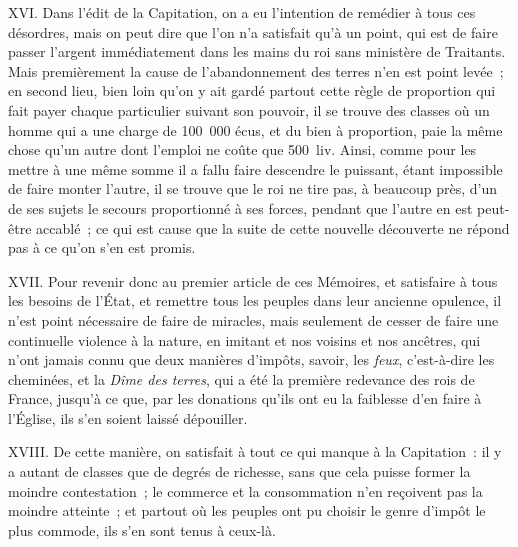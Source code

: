 \documentclass[french,twoside]{book} %
\begin{document}
XVI. Dans l’édit de la Capitation, on a eu l’intention de remédier à tous ces désordres, mais on peut dire que l’on n’a satisfait qu’à un point, qui est de faire passer l’argent immédiatement dans les mains du roi sans ministère de Traitants. Mais premièrement la cause de l’abandonnement des terres n’en est point levée ; en second lieu, bien loin qu’on y ait gardé partout cette règle de proportion qui fait payer chaque particulier suivant son pouvoir, il se trouve des classes où un homme qui a une charge de 100 000 écus, et du bien à proportion, paie la même chose qu’un autre dont l’emploi ne coûte que 500 liv. Ainsi, comme pour les mettre à une même somme il a fallu faire descendre le puissant, étant impossible de faire monter l’autre, il se trouve que le roi ne tire pas, à beaucoup près, d’un de ses sujets le secours proportionné à ses forces, pendant que l’autre en est peut-être accablé ; ce qui est cause que la suite de cette nouvelle découverte ne répond pas à ce qu’on s’en est promis.\par
XVII. Pour revenir donc au premier article de ces Mémoires, et satisfaire à tous les besoins de l’État, et remettre tous les peuples dans leur ancienne opulence, il n’est point nécessaire de faire de miracles, mais seulement de cesser de faire une continuelle violence à la nature, en imitant et nos voisins et nos ancêtres, qui n’ont jamais connu que deux manières d’impôts, savoir, les {\itshape feux}, c’est-à-dire les cheminées, et la {\itshape Dîme des terres}, qui a été la première redevance des rois de France, jusqu’à ce que, par les donations qu’ils ont eu la faiblesse d’en faire à l’Église, ils s’en soient laissé dépouiller.\par
XVIII. De cette manière, on satisfait à tout ce qui manque à la Capitation : il y a autant de classes que de degrés de richesse, sans que cela puisse former la moindre contestation ; le commerce et la consommation n’en reçoivent pas la moindre atteinte ; et partout où les peuples ont pu choisir le genre d’impôt le plus commode, ils s’en sont tenus à ceux-là.\par
\end{document}
